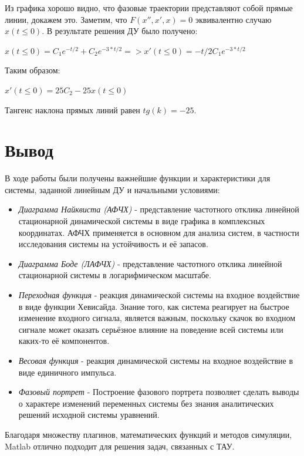 \documentclass[14pt,a4paper,report]{report}
\begin{document}
Из графика хорошо видно, что фазовые траектории представляют собой прямые линии, докажем это. Заметим, что $F(x'',x',x)=0$ эквивалентно случаю $x(t\leq0)$. В результате решения ДУ было получено:

$x(t\leq0)=C_1e^{-t/2}+C_2e^{-3*t/2} => x'(t\leq0)=-t/2C_1e^{-3*t/2}$

Таким образом:

$x'(t\leq0)=25C_2-25x(t\leq0)$

Тангенс наклона прямых линий равен $tg(k)=-25$.






\section{Вывод}

В ходе работы были получены важнейшие функции и характеристики для системы, заданной линейным ДУ и начальными условиями:

\begin{itemize}
	\item \emph{Диаграмма Найквиста (АФЧХ)} - представление частотного отклика линейной стационарной динамической системы в виде графика в комплексных координатах. АФЧХ применяется в основном для анализа систем, в частности исследования системы на устойчивость и её запасов.
	\item \emph{Диаграмма Боде (ЛАФЧХ)} - представление частотного отклика линейной стационарной системы в логарифмическом масштабе.
	\item \emph{Переходная функция} - реакция динамической системы на входное воздействие в виде функции Хевисайда. Знание того, как система реагирует на быстрое изменение входного сигнала, является важным, поскольку скачок во входном сигнале может оказать серьёзное влияние на поведение всей системы или каких-то её компонентов.
	\item \emph{Весовая функция} - реакция динамической системы на входное воздействие в виде единичного импульса. 
	\item \emph{Фазовый портрет} - Построение фазового портрета позволяет сделать выводы о характере изменений переменных системы без знания аналитических решений исходной системы уравнений.
\end{itemize}

Благодаря множеству плагинов, математических функций и методов симуляции, Matlab отлично подходит для решения задач, связанных с ТАУ.
\end{document}
